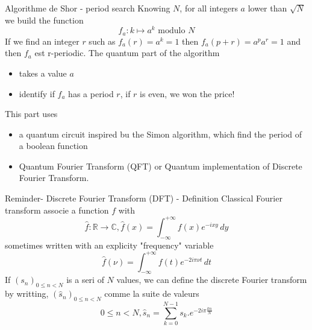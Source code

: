 \begin{frame}{Algorithme de Shor - period search}
Knowing $N$, for all integers $a$ lower than  $\sqrt{N}$ we build the function
\begin{equation*}
    f_a: k \mapsto a^k \textrm{ modulo } N
\end{equation*}
If we find an integer $r$ such as $f_a(r) = a^k = 1$ then $f_a(p+r) = a^p a^r = 1$ and then $f_a$ est r-periodic. 
\newline \newline
The quantum part of the algorithm
\begin{itemize}
    \item takes a value $a$
    \item identify if $f_a$ has a period $r$, if $r$ is even, we won the price!
\end{itemize}
This part uses
\begin{itemize}
    \item a quantum circuit inspired bu the Simon algorithm, which find the period of a boolean function
    \item Quantum Fourier Transform (QFT) or Quantum implementation of Discrete Fourier Transform.
\end{itemize}
\end{frame}

\begin{frame}{Reminder- Discrete Fourier Transform (DFT) - Definition}
Classical Fourier transform associe a function $f$ with
\begin{equation*}
    \hat{f}: \mathbb{R} \rightarrow{} \mathbb{C}, 
    \hat{f}(x) = \int_{-\infty}^{+\infty} f(x) e^{-ixy}  \,dy
\end{equation*}
sometimes written with an explicity "frequency" variable
\begin{equation*}
    \hat{f}(\nu) = \int_{-\infty}^{+\infty} f(t) e^{-2i\pi \nu t}  \,dt
\end{equation*}
If $(s_n)_{0\le n < N}$ is a seri of $N$ values, we can define the discrete Fourier transform by writting, 
$(\hat{s}_n)_{0\le n < N}$ comme la suite de valeurs
\begin{equation*}
    0 \le n < N, \hat{s}_n = \sum_{k=0}^{N-1}s_k.e^{-2i\pi\frac{kn}{N}}
\end{equation*}
\end{frame}


